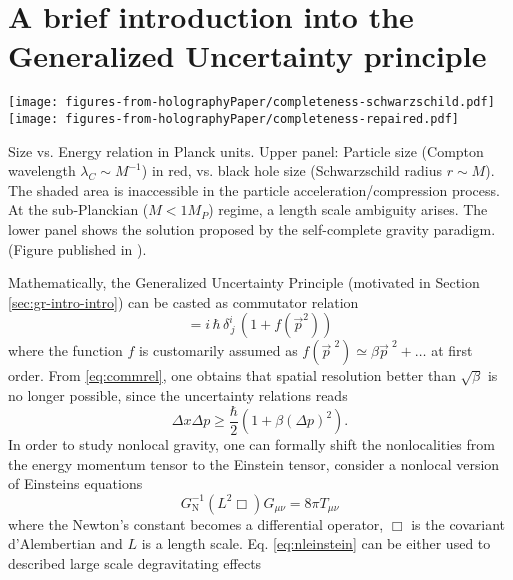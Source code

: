 \section{A brief introduction into the Generalized Uncertainty principle}
%
\begin{marginfigure}[3cm]
	\texttt{[image: figures-from-holographyPaper/completeness-schwarzschild.pdf]}
	\texttt{[image: figures-from-holographyPaper/completeness-repaired.pdf]}
	\caption[
	Size vs Energy relations at the Planck scale, 
	]{
		Size vs. Energy relation in Planck units. Upper panel: Particle size (Compton
		wavelength $\lambda_C \sim M^{-1}$) in red, vs. black hole size (Schwarzschild
		radius $r \sim M$). The shaded area is inaccessible in the particle
		acceleration/compression process. At the sub-Planckian ($M<1 M_P$) regime, a
		length scale ambiguity arises.
		The lower panel shows the solution proposed by the self-complete gravity paradigm. 
		(Figure published in \cite{FKN16}).
	}\label{fig:completeness-intro}
\end{marginfigure}%
%
Mathematically, the Generalized Uncertainty Principle (motivated in Section
\ref{sec:gr-intro-intro}) can be casted as commutator relation
\begin{equation}
[x^i, p_j] = i\, \hbar\, \delta^i_{\, j} \, (1+f( \vec{p}^2))
\label{eq:commrel}
\end{equation}
where the function $f$ is customarily assumed as $f(\vec{ p}^{\,\,2})\simeq 
\beta \vec{ p}^{\,\,2}+\dots$ at first order. From \eqref{eq:commrel}, one 
obtains that spatial resolution better than $\sqrt{\beta}$ is no longer 
possible, since the uncertainty relations reads 
\begin{equation}
\Delta x \Delta p \geq \frac \hbar2 (1+\beta(\Delta p)^2).
\label{eq:gup}
\end{equation}
In order to study nonlocal gravity, one can formally shift the nonlocalities
from the energy momentum tensor to the Einstein tensor, \ie consider a
nonlocal version of Einsteins equations \cite{Kra87,Tom97,Bar03,Mod12a}
\begin{equation}
G_\mathrm{N}^{-1}\left(L^2\Box\right)G_{\mu\nu}=8\pi T_{\mu\nu}
\label{eq:nleinstein}
\end{equation}
where the Newton's constant becomes a differential operator, $\Box$ is the 
covariant d'Alembertian and $L$ is a length scale. Eq. \eqref{eq:nleinstein} 
can be either used to described large scale degravitating effects 

